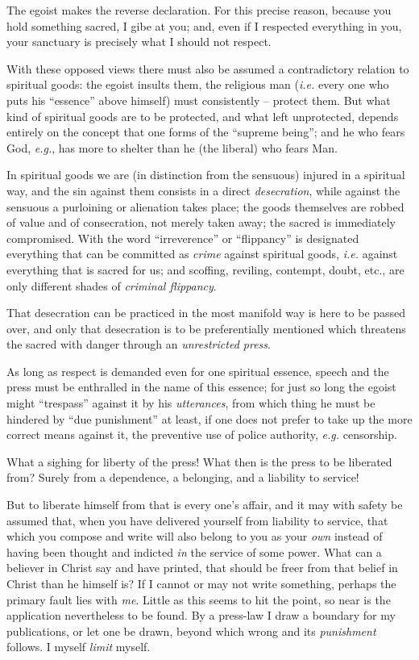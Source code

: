 \documentclass[12pt,a4paper]{book}
\begin{document}
The egoist makes the reverse declaration. For this precise reason, because you 
hold something sacred, I gibe at you; and, even if I respected everything in 
you, your sanctuary is precisely what I should not respect.

With these opposed views there must also be assumed a contradictory relation 
to spiritual goods: the egoist insults them, the religious man (\textit{i.e.} 
every one who puts his ``essence'' above himself) must consistently -- 
protect them. But what kind of spiritual goods are to be protected, and what 
left unprotected, depends entirely on the concept that one forms of the 
``supreme being''; and he who fears God, \textit{e.g.}, has more to shelter 
than he (the liberal) who fears Man.

In spiritual goods we are (in distinction from the sensuous) injured in a 
spiritual way, and the sin against them consists in a direct 
\textit{desecration}, while against the sensuous a purloining or alienation 
takes place; the goods themselves are robbed of value and of consecration, not 
merely taken away; the sacred is immediately compromised. With the word 
``irreverence'' or ``flippancy'' is designated everything that can be 
committed as \textit{crime} against spiritual goods, \textit{i.e.} against 
everything that is sacred for us; and scoffing, reviling, contempt, doubt, 
etc., are only different shades of \textit{criminal flippancy}.

That desecration can be practiced in the most manifold way is here to be 
passed over, and only that desecration is to be preferentially mentioned which 
threatens the sacred with danger through an \textit{unrestricted press}.

As long as respect is demanded even for one spiritual essence, speech and the 
press must be enthralled in the name of this essence; for just so long the 
egoist might ``trespass'' against it by his \textit{utterances}, from which 
thing he must be hindered by ``due punishment'' at least, if one does not 
prefer to take up the more correct means against it, the preventive use of 
police authority, \textit{e.g.} censorship.

What a sighing for liberty of the press! What then is the press to be 
liberated from? Surely from a dependence, a belonging, and a liability to 
service!

But to liberate himself from that is every one's affair, and it may with 
safety be assumed that, when you have delivered yourself from liability to 
service, that which you compose and write will also belong to you as your 
\textit{own} instead of having been thought and indicted \textit{in} the 
service of some power. What can a believer in Christ say and have printed, 
that should be freer from that belief in Christ than he himself is? If I 
cannot or may not write something, perhaps the primary fault lies with 
\textit{me}. Little as this seems to hit the point, so near is the application 
nevertheless to be found. By a press-law I draw a boundary for my 
publications, or let one be drawn, beyond which wrong and its 
\textit{punishment} follows. I myself \textit{limit} myself.
\end{document}
